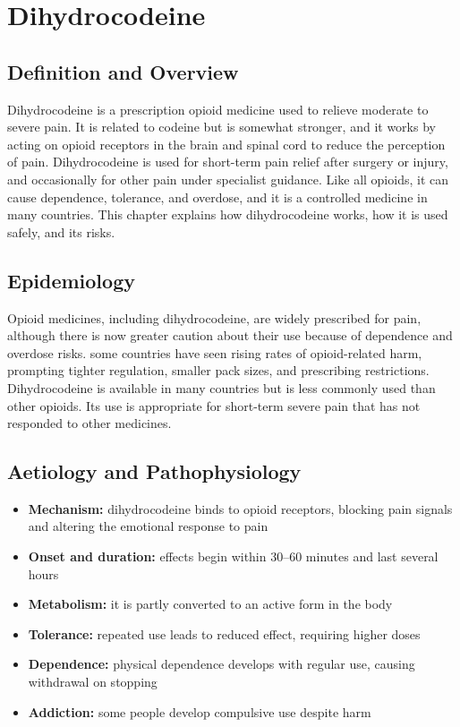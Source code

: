 \chapter{Dihydrocodeine}

\section*{Definition and Overview}
Dihydrocodeine is a prescription opioid medicine used to relieve moderate to severe pain. It is related to codeine but is somewhat stronger, and it works by acting on opioid receptors in the brain and spinal cord to reduce the perception of pain. Dihydrocodeine is used for short-term pain relief after surgery or injury, and occasionally for other pain under specialist guidance. Like all opioids, it can cause dependence, tolerance, and overdose, and it is a controlled medicine in many countries. This chapter explains how dihydrocodeine works, how it is used safely, and its risks.

\section*{Epidemiology}
Opioid medicines, including dihydrocodeine, are widely prescribed for pain, although there is now greater caution about their use because of dependence and overdose risks. some countries have seen rising rates of opioid-related harm, prompting tighter regulation, smaller pack sizes, and prescribing restrictions. Dihydrocodeine is available in many countries but is less commonly used than other opioids. Its use is appropriate for short-term severe pain that has not responded to other medicines.

\section*{Aetiology and Pathophysiology}
\begin{itemize}
    \item \textbf{Mechanism:} dihydrocodeine binds to opioid receptors, blocking pain signals and altering the emotional response to pain
    \item \textbf{Onset and duration:} effects begin within 30--60 minutes and last several hours
    \item \textbf{Metabolism:} it is partly converted to an active form in the body
    \item \textbf{Tolerance:} repeated use leads to reduced effect, requiring higher doses
    \item \textbf{Dependence:} physical dependence develops with regular use, causing withdrawal on stopping
    \item \textbf{Addiction:} some people develop compulsive use despite harm
\end{itemize}


